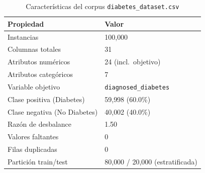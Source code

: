 \begin{table}[!t]
\renewcommand{\arraystretch}{1.2}
\caption{Características del corpus \texttt{diabetes\_dataset.csv}}
\label{tab:dataset}
\centering
\begin{tabular}{l l}
\toprule
\textbf{Propiedad} & \textbf{Valor} \\
\midrule
Instancias & 100{,}000 \\
Columnas totales & 31 \\
Atributos numéricos & 24 (incl.\ objetivo) \\
Atributos categóricos & 7 \\
Variable objetivo & \texttt{diagnosed\_diabetes} \\
Clase positiva (Diabetes) & 59{,}998 (60.0\%) \\
Clase negativa (No Diabetes) & 40{,}002 (40.0\%) \\
Razón de desbalance & 1.50 \\
Valores faltantes & 0 \\
Filas duplicadas & 0 \\
Partición train/test & 80{,}000 / 20{,}000 (estratificada) \\
\bottomrule
\end{tabular}
\end{table}
